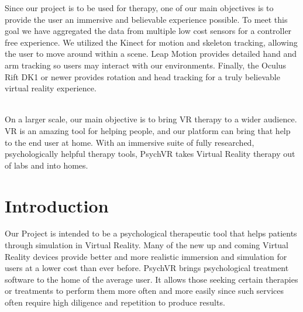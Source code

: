 \documentclass[a4paper,10pt]{article}
\begin{document}
Since our project is to be used for therapy, one of our main objectives is to provide the user an immersive and believable experience possible. To meet this goal we have aggregated the data from multiple low cost sensors for a controller free experience. We utilized the Kinect for motion and skeleton tracking, allowing the user to move around within a scene. Leap Motion provides detailed hand and arm tracking so users may interact with our environments. Finally, the Oculus Rift DK1 or newer provides rotation and head tracking for a truly believable virtual reality experience.
\par ~\\
On a larger scale, our main objective is to bring VR therapy to a wider audience.  VR is an amazing tool for helping people, and our platform can bring that help to the end user at home.  With an immersive suite of fully researched, psychologically helpful therapy tools, PsychVR takes Virtual Reality therapy out of labs and into homes.

\pagebreak
	\section{Introduction}
	Our Project is intended to be a psychological therapeutic tool that helps patients through simulation in Virtual Reality.	Many of the new up and coming Virtual Reality devices provide better and more realistic immersion and simulation for users at a lower cost than ever before. PsychVR brings psychological treatment software to the home of the average user. It allows those seeking certain therapies or treatments to perform them more often and more easily since such services often require high diligence and repetition to produce results.
	
\end{document}
